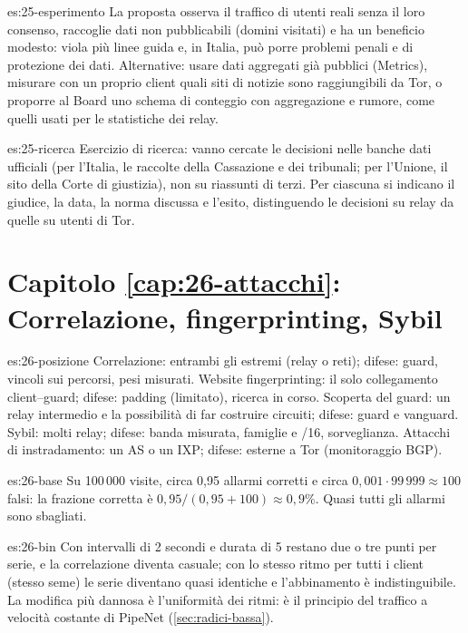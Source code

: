 \begin{soluzione}{es:25-esperimento}
La proposta osserva il traffico di utenti reali senza il loro consenso, raccoglie dati non pubblicabili (domini visitati) e ha un beneficio modesto: viola più linee guida e, in Italia, può porre problemi penali e di protezione dei dati. Alternative: usare dati aggregati già pubblici (Metrics), misurare con un proprio client quali siti di notizie sono raggiungibili da Tor, o proporre al Board uno schema di conteggio con aggregazione e rumore, come quelli usati per le statistiche dei relay.
\end{soluzione}

\begin{soluzione}{es:25-ricerca}
Esercizio di ricerca: vanno cercate le decisioni nelle banche dati ufficiali (per l'Italia, le raccolte della Cassazione e dei tribunali; per l'Unione, il sito della Corte di giustizia), non su riassunti di terzi. Per ciascuna si indicano il giudice, la data, la norma discussa e l'esito, distinguendo le decisioni su relay da quelle su utenti di Tor.
\end{soluzione}

\section*{Capitolo \ref{cap:26-attacchi}: Correlazione, fingerprinting, Sybil}

\begin{soluzione}{es:26-posizione}
Correlazione: entrambi gli estremi (relay o reti); difese: guard, vincoli sui percorsi, pesi misurati. Website fingerprinting: il solo collegamento client--guard; difese: padding (limitato), ricerca in corso. Scoperta del guard: un relay intermedio e la possibilità di far costruire circuiti; difese: guard e vanguard. Sybil: molti relay; difese: banda misurata, famiglie e /16, sorveglianza. Attacchi di instradamento: un AS o un IXP; difese: esterne a Tor (monitoraggio BGP).
\end{soluzione}

\begin{soluzione}{es:26-base}
Su 100\,000 visite, circa 0,95 allarmi corretti e circa $0{,}001 \cdot 99\,999 \approx 100$ falsi: la frazione corretta è $0{,}95/(0{,}95+100) \approx 0{,}9\%$. Quasi tutti gli allarmi sono sbagliati.
\end{soluzione}

\begin{soluzione}{es:26-bin}
Con intervalli di 2 secondi e durata di 5 restano due o tre punti per serie, e la correlazione diventa casuale; con lo stesso ritmo per tutti i client (stesso seme) le serie diventano quasi identiche e l'abbinamento è indistinguibile. La modifica più dannosa è l'uniformità dei ritmi: è il principio del traffico a velocità costante di PipeNet (\cref{sec:radici-bassa}).
\end{soluzione}

